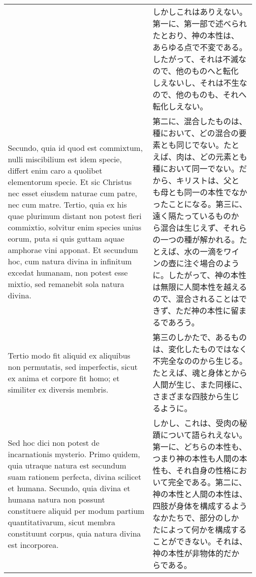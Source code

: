 \documentclass[10pt]{jsarticle} %
\begin{document}
\begin{longtable}{p{21em}p{21em}}
&


しかしこれはありえない。第一に、第一部で述べられたとおり、神の本性は、
あらゆる点で不変である。したがって、それは不滅なので、他のものへと転化
しえないし、それは不生なので、他のものも、それへ転化しえない。


\\


Secundo, quia id quod est commixtum, nulli miscibilium est idem
specie, differt enim caro a quolibet elementorum specie. Et sic
Christus nec esset eiusdem naturae cum patre, nec cum matre. Tertio,
quia ex his quae plurimum distant non potest fieri commixtio, solvitur
enim species unius eorum, puta si quis guttam aquae amphorae vini
apponat. Et secundum hoc, cum natura divina in infinitum excedat
humanam, non potest esse mixtio, sed remanebit sola natura divina.

&

第二に、混合したものは、種において、どの混合の要素とも同じでない。たと
えば、肉は、どの元素とも種において同一でない。だから、キリストは、父と
も母とも同一の本性でなかったことになる。第三に、遠く隔たっているものか
ら混合は生じえず、それらの一つの種が解かれる。たとえば、水の一滴をワイ
ンの壺に注ぐ場合のように。したがって、神の本性は無限に人間本性を越える
ので、混合されることはできず、ただ神の本性に留まるであろう。

\\


Tertio modo fit aliquid ex aliquibus non permutatis, sed imperfectis,
sicut ex anima et corpore fit homo; et similiter ex diversis membris.


&

第三のしかたで、あるものは、変化したものではなく不完全なののから生じる。
たとえば、魂と身体とから人間が生じ、また同様に、さまざまな四肢から生じ
るように。


\\


Sed hoc dici non potest de incarnationis mysterio. Primo quidem, quia
utraque natura est secundum suam rationem perfecta, divina scilicet et
humana. Secundo, quia divina et humana natura non possunt constituere
aliquid per modum partium quantitativarum, sicut membra constituunt
corpus, quia natura divina est incorporea.


&


しかし、これは、受肉の秘蹟について語られえない。第一に、どちらの本性も、
つまり神の本性も人間の本性も、それ自身の性格において完全である。第二に、
神の本性と人間の本性は、四肢が身体を構成するようなかたちで、部分のしか
たによって何かを構成することができない。それは、神の本性が非物体的だか
らである。



\end{longtable}
\end{document}
